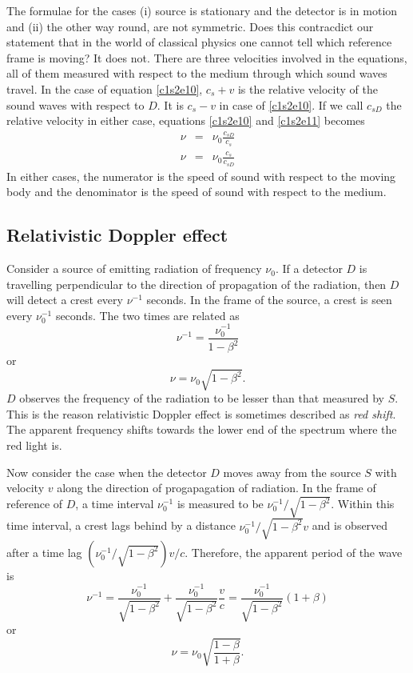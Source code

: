 The formulae for the cases (i) source is stationary and the detector is in 
motion and (ii) the other way round, are not symmetric. Does this contracdict
our statement that in the world of classical physics one cannot tell which
reference frame is moving? It does not. There are three velocities involved
in the equations, all of them measured with respect to the medium through 
which sound waves travel. In the case of equation \eqref{c1s2e10}, $c_s + v$
is the relative velocity of the sound waves with respect to $D$. It is $c_s
-v$ in case of \eqref{c1s2e10}. If we call $c_{sD}$ the relative velocity
in either case, equations \eqref{c1s2e10} and \eqref{c1s2e11} becomes
\begin{eqnarray}
\nu &=& \nu_0\frac{c_{sD}}{c_s} \\
\nu &=& \nu_0\frac{c_s}{c_{sD}}
\end{eqnarray}
In either cases, the numerator is the speed of sound with respect to the moving
body and the denominator is the speed of sound with respect to the medium.

\subsection{Relativistic Doppler effect}
Consider a source of emitting radiation of frequency $\nu_0$. If a detector
$D$ is travelling perpendicular to the direction of propagation of the
radiation, then $D$ will detect a crest every $\nu^{-1}$ seconds. In the frame
of the source, a crest is seen every $\nu_0^{-1}$ seconds. The two times are
related as
\[
\nu^{-1} = \frac{\nu_0^{-1}}{1 - \beta^2}
\]
or
\begin{equation}\label{c1s2e14}
\nu = \nu_0\sqrt{1 - \beta^2}.
\end{equation}
$D$ observes the frequency of the radiation to be lesser than that measured by
$S$. This is the reason relativistic Doppler effect is sometimes described as
\emph{red shift}. The apparent frequency shifts towards the lower end of the
spectrum where the red light is. 

Now consider the case when the detector $D$ moves away from the source $S$ with
velocity $v$ along the direction of progapagation of radiation. In the frame of
reference of $D$, a time interval $\nu_0^{-1}$ is measured to be 
$\nu_0^{-1}/\sqrt{1 - \beta^2}$. Within this time interval, a crest lags behind
by a distance $\nu_0^{-1}/\sqrt{1 - \beta^2}v$ and is observed after a time lag
$(\nu_0^{-1}/\sqrt{1 - \beta^2})v/c$. Therefore, the apparent period of the wave is
\[
\nu^{-1} = \frac{\nu_0^{-1}}{\sqrt{1 - \beta^2}} + 
\frac{\nu_0^{-1}}{\sqrt{1 - \beta^2}}\frac{v}{c} = 
\frac{\nu_0^{-1}}{\sqrt{1 - \beta^2}}(1 + \beta)
\]
or
\begin{equation}\label{c1s2e15}
\nu = \nu_0\sqrt{\frac{1 - \beta}{1 + \beta}}.
\end{equation}

